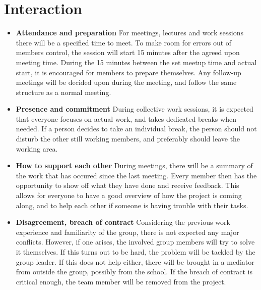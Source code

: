 \documentclass{article}
\begin{document}
\section{Interaction}
\begin{itemize}
    \item \textbf{Attendance and preparation} \newline For meetings, lectures and work sessions there will be a specified time to meet. To make room for errors out of members control, the session  will start 15 minutes after the agreed upon meeting time. During the 15 minutes between the set meetup time and actual start, it is encouraged for members to prepare themselves. Any follow-up meetings will be decided upon during the meeting, and follow the same structure as a normal meeting. 
    \newpage
    \item \textbf{Presence and commitment} \newline During collective work sessions, it is expected that everyone focuses on actual work, and takes dedicated breaks when needed. If a person decides to take an individual break, the person should not disturb the other still working members, and preferably should leave the working area. 
    \item \textbf{How to support each other} \newline During meetings, there will be a summary of the work that has occured since the last meeting. Every member then has the opportunity to show off what they have done and receive feedback. This allows for everyone to have a good overview of how the project is coming along, and to help each other if someone is having trouble with their tasks. 
    \item \textbf{Disagreement, breach of contract} \newline Considering the previous work experience and familiarity of the group, there is not expected any major conflicts. However, if one arises, the involved group members will try to solve it themselves. If this turns out to be hard, the problem will be tackled by the group leader. If this does not help either, there will be brought in a mediator from outside the group, possibly from the school. If the breach of contract is critical enough, the team member will be removed from the project.
\end{itemize}

\vfill
\end{document}
